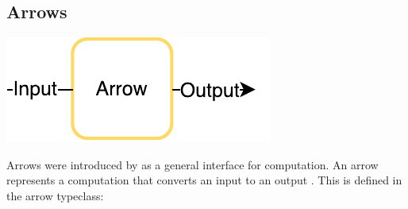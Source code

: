 \subsection{Arrows}
\label{sec:arrows}
\begin{center}
	\includegraphics[]{images/arrow}
\end{center}
Arrows were introduced by \citet{HughesArrows} as a general interface for computation. An arrow  represents  a computation that converts an input  to an output . This is defined in the arrow typeclass:

